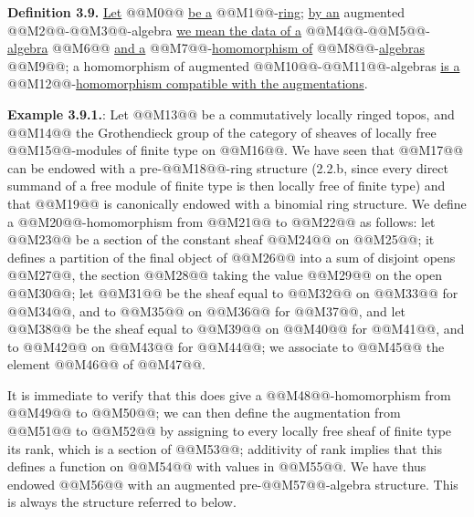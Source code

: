 \textbf{Definition 3.9.} \uline{Let} @@M0@@ \uline{be a} @@M1@@-\uline{ring}; \uline{by an} augmented @@M2@@-@@M3@@-algebra \uline{we mean the data of a} @@M4@@-@@M5@@-\uline{algebra} @@M6@@ \uline{and a} @@M7@@-\uline{homomorphism of} @@M8@@-\uline{algebras} @@M9@@; a homomorphism of augmented @@M10@@-@@M11@@-algebras \uline{is a} @@M12@@-\uline{homomorphism compatible with the augmentations}.

\textbf{Example 3.9.1.}: Let @@M13@@ be a commutatively locally ringed topos, and @@M14@@ the Grothendieck group of the category of sheaves of locally free @@M15@@-modules of finite type on @@M16@@. We have seen that @@M17@@ can be endowed with a pre-@@M18@@-ring structure (2.2.b, since every direct summand of a free module of finite type is then locally free of finite type) and that @@M19@@ is canonically endowed with a binomial ring structure. We define a @@M20@@-homomorphism from @@M21@@ to @@M22@@ as follows: let @@M23@@ be a section of the constant sheaf @@M24@@ on @@M25@@; it defines a partition of the final object of @@M26@@ into a sum of disjoint opens @@M27@@, the section @@M28@@ taking the value @@M29@@ on the open @@M30@@; let @@M31@@ be the sheaf equal to @@M32@@ on @@M33@@ for @@M34@@, and to @@M35@@ on @@M36@@ for @@M37@@, and let @@M38@@ be the sheaf equal to @@M39@@ on @@M40@@ for @@M41@@, and to @@M42@@ on @@M43@@ for @@M44@@; we associate to @@M45@@ the element @@M46@@ of @@M47@@.

It is immediate to verify that this does give a @@M48@@-homomorphism from @@M49@@ to @@M50@@; we can then define the augmentation from @@M51@@ to @@M52@@ by assigning to every locally free sheaf of finite type its rank, which is a section of @@M53@@; additivity of rank implies that this defines a function on @@M54@@ with values in @@M55@@. We have thus endowed @@M56@@ with an augmented pre-@@M57@@-algebra structure. This is always the structure referred to below.


